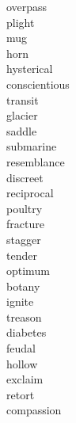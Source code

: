 \documentclass[a4paper, 11pt]{ctexart}
\begin{document}
\begin{multicols*}{3}
\begin{description}
\item[overpass]

\item[plight]

\item[mug]

\item[horn]

\item[hysterical]

\item[conscientious]

\item[transit]

\item[glacier]

\item[saddle]

\item[submarine]

\item[resemblance]

\item[discreet]

\item[reciprocal]

\item[poultry]

\item[fracture]

\item[stagger]

\item[tender]

\item[optimum]

\item[botany]

\item[ignite]

\item[treason]

\item[diabetes]

\item[feudal]

\item[hollow]

\item[exclaim]

\item[retort]

\item[compassion]


\end{description}
\end{multicols*}
\end{document}
